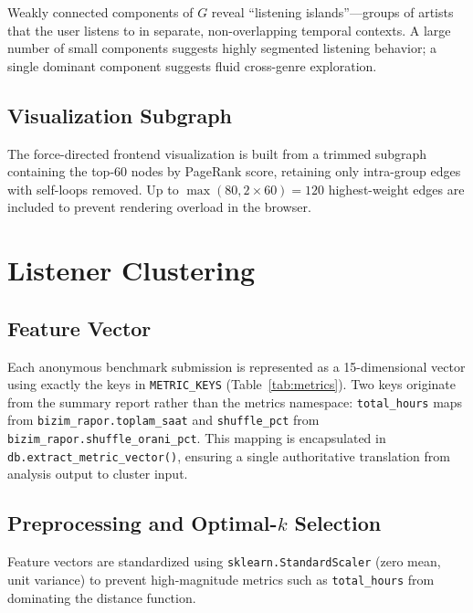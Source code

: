 \documentclass[conference]{IEEEtran}
\begin{document}
Weakly connected components of $G$ reveal ``listening islands''—groups of
artists that the user listens to in separate, non-overlapping temporal
contexts. A large number of small components suggests highly segmented
listening behavior; a single dominant component suggests fluid cross-genre
exploration.

\subsection{Visualization Subgraph}

The force-directed frontend visualization is built from a trimmed subgraph
containing the top-60 nodes by PageRank score, retaining only intra-group
edges with self-loops removed. Up to $\max(80, 2 \times 60) = 120$
highest-weight edges are included to prevent rendering overload in the
browser.

\section{Listener Clustering}

\subsection{Feature Vector}

Each anonymous benchmark submission is represented as a 15-dimensional
vector using exactly the keys in \texttt{METRIC\_KEYS}
(Table~\ref{tab:metrics}). Two keys originate from the summary report rather
than the metrics namespace: \texttt{total\_hours} maps from
\texttt{bizim\_rapor.toplam\_saat} and \texttt{shuffle\_pct} from
\texttt{bizim\_rapor.shuffle\_orani\_pct}. This mapping is encapsulated in
\texttt{db.extract\_metric\_vector()}, ensuring a single authoritative
translation from analysis output to cluster input.

\subsection{Preprocessing and Optimal-\texorpdfstring{$k$}{k} Selection}

Feature vectors are standardized using \texttt{sklearn.StandardScaler}
(zero mean, unit variance) to prevent high-magnitude metrics such as
\texttt{total\_hours} from dominating the distance function.
\end{document}
